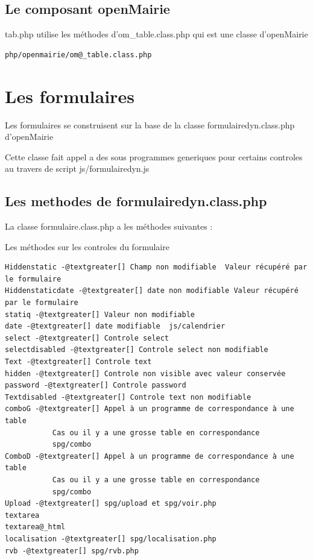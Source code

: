 \documentclass[letterpaper,10pt,french]{manual}
\begin{document}
\subsection{Le composant openMairie}

tab.php utilise les méthodes d'om\_table.class.php qui est une classe d'openMairie

\begin{Verbatim}[commandchars=@\[\]]
php/openmairie/om@_table.class.php
\end{Verbatim}

\resetcurrentobjects
\hypertarget{--doc-framework/formulaire}{}

\hypertarget{formulaire}{}\section{Les formulaires}

Les formulaires se construisent sur la base de la classe
formulairedyn.class.php d'openMairie

Cette classe fait appel a des sous programmes generiques pour certains
controles au travers de script js/formulairedyn.js


\subsection{Les methodes de formulairedyn.class.php}

La classe formulaire.class.php a les méthodes suivantes :

Les méthodes sur les controles du formulaire

\begin{Verbatim}[commandchars=@\[\]]
Hiddenstatic -@textgreater[] Champ non modifiable  Valeur récupéré par le formulaire
Hiddenstaticdate -@textgreater[] date non modifiable Valeur récupéré par le formulaire
statiq -@textgreater[] Valeur non modifiable
date -@textgreater[] date modifiable  js/calendrier
select -@textgreater[] Controle select
selectdisabled -@textgreater[] Controle select non modifiable
Text -@textgreater[] Controle text
hidden -@textgreater[] Controle non visible avec valeur conservée
password -@textgreater[] Controle password
Textdisabled -@textgreater[] Controle text non modifiable
comboG -@textgreater[] Appel à un programme de correspondance à une table
           Cas ou il y a une grosse table en correspondance
           spg/combo
ComboD -@textgreater[] Appel à un programme de correspondance à une table
           Cas ou il y a une grosse table en correspondance
           spg/combo
Upload -@textgreater[] spg/upload et spg/voir.php
textarea
textarea@_html
localisation -@textgreater[] spg/localisation.php
rvb -@textgreater[] spg/rvb.php
\end{Verbatim}
\end{document}
